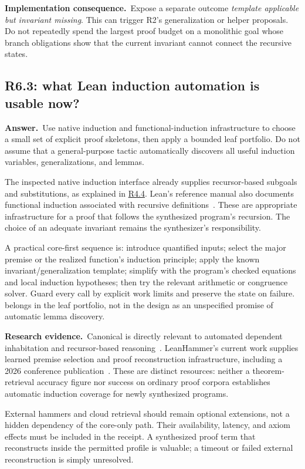 \documentclass[11pt,a4paper]{article}
\theoremstyle{definition}
\theoremstyle{remark}
\newcommand{\code}[1]{\texttt{\detokenize{#1}}}
\newcommand{\ans}{\noindent\textbf{Answer.}\ }
\newcommand{\imp}{\par\noindent\textbf{Implementation consequence.}\ }
\newcommand{\lit}{\par\noindent\textbf{Research evidence.}\ }
\newcommand{\qref}[1]{\hyperref[q:#1]{#1}}
\begin{document}
\imp Expose a separate outcome \emph{template applicable but invariant missing}.
This can trigger R2's generalization or helper proposals. Do not repeatedly
spend the largest proof budget on a monolithic goal whose branch obligations
show that the current invariant cannot connect the recursive states.

\subsection{R6.3: what Lean induction automation is usable now?}\label{q:R6.3}
\ans Use native induction and functional-induction infrastructure to choose a
small set of explicit proof skeletons, then apply a bounded leaf portfolio.
Do not assume that a general-purpose tactic automatically discovers all useful
induction variables, generalizations, and lemmas.

The inspected native induction interface already supplies recursor-based
subgoals and substitutions, as explained in \qref{R4.4}. Lean's reference
manual also documents functional induction associated with recursive
definitions~\cite{lean-recursion}. These are appropriate infrastructure for a
proof that follows the synthesized program's recursion. The choice of an
adequate invariant remains the synthesizer's responsibility.

A practical core-first sequence is: introduce quantified inputs; select the
major premise or the realized function's induction principle; apply the known
invariant/generalization template; simplify with the program's checked
equations and local induction hypotheses; then try the relevant arithmetic or
congruence solver. Guard every call by explicit work limits and preserve the
state on failure. \code{grind} belongs in the leaf portfolio, not in the design
as an unspecified promise of automatic lemma discovery.

\lit Canonical is directly relevant to automated dependent inhabitation and
recursor-based reasoning~\cite{canonical}. LeanHammer's current work supplies
learned premise selection and proof reconstruction infrastructure, including
a 2026 conference publication~\cite{leanhammer}. These are distinct resources:
neither a theorem-retrieval accuracy figure nor success on ordinary proof
corpora establishes automatic induction coverage for newly synthesized
programs.

External hammers and cloud retrieval should remain optional extensions, not a
hidden dependency of the core-only path. Their availability, latency, and
axiom effects must be included in the receipt. A synthesized proof term that
reconstructs inside the permitted profile is valuable; a timeout or failed
external reconstruction is simply unresolved.
\end{document}
